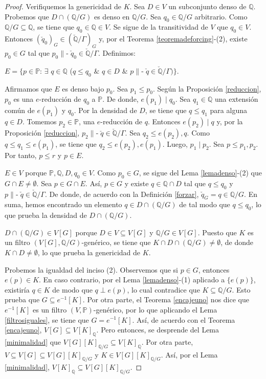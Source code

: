 \documentclass[11pt]{unam_tesis1}
\theoremstyle{MyThmStyle}
\theoremstyle{definition}
\theoremstyle{plain}
\theoremstyle{remark}
\def\forces{\mathop{\parallel\!\!\!-}\nolimits}
\let\Vdash\forces
\let\leq\leqslant
\begin{document}
\begin{proof}
Verifiquemos la genericidad de $K$. Sea $D\in V$ un subconjunto denso de $\mathbb Q$. Probemos que $D\cap (\mathbb Q/G)$ es denso en $\mathbb Q/G$. Sea $q_0\in \mathbb Q/G$ arbitrario. Como $\mathbb Q/G\subseteq \mathbb Q$, se tiene que $q_0\in \mathbb Q\in V$. Se sigue de la transitividad de $V$ que $q_0\in V$. Entonces $(\check{q}_0)_G\in (\check {\mathbb Q}/\Gamma )_G$ y, por el Teorema \ref{teoremadeforcing}-(2), existe $p_0\in G$ tal que $p_0\Vdash \check{q}_0 \in \check {\mathbb Q}/\Gamma$. Definimos:
\begin{center}
$E=\{p\in \mathbb P$: $\exists$ $q\in \mathbb Q$ ($q\leq q_0$ $\&$ $q\in D$ $\&$ $p\Vdash \check{q} \in \check{\mathbb Q}/\Gamma ) \}$.
\end{center}
Afirmamos que $E$ es denso bajo $p_0$. Sea $p_1\leq p_0$. Seg\'un la Proposici\'on \ref{reduccion}, $p_0$ es una $e$-reducci\'on de $q_0$ a $\mathbb P$. De donde, $e(p_1)\mid q_0$. Sea $q_1\in \mathbb Q$ una extensi\'on com\'un de $e(p_1)$ y $q_0$. Por la densidad de $D$, se tiene que $q\leq q_1$ para alguna $q\in D$. Tomemos $p_2\in \mathbb P$, una $e$-reducci\'on de $q$. Entonces $e(p_2)\mid q$ y, por la Proposici\'on \ref{reduccion}, $p_2\Vdash \check{q}\in \check{\mathbb Q}/\Gamma$. Sea $q_2\leq e(p_2), q$. Como $q\leq q_1\leq e(p_1)$, se tiene que $q_2\leq e(p_2), e(p_1)$. Luego, $p_1\mid p_2$. Sea $p\leq p_1,p_2$. Por tanto, $p\leq r$ y $p\in E$.

$E\in V$ porque $\mathbb P,\mathbb Q,D,q_0\in V$. Como $p_0\in G$, se sigue del Lema \ref{lemadenso}-(2) que $G\cap E\neq \emptyset$. Sea $p\in G\cap E$. As\'i, $p\in G$ y existe $q\in \mathbb Q \cap D$ tal que $q\leq q_0$ y $p\Vdash \check{q}\in \check{\mathbb Q}/\Gamma$. De donde, de acuerdo con la Definici\'on \ref{forzar}, $\check{q}_G=q\in \mathbb Q/G$. En suma, hemos encontrado un elemento $q\in D\cap (\mathbb Q/G)$ de tal modo que $q\leq q_0$, lo que prueba la densidad de $D\cap (\mathbb Q/G)$.

$D\cap (\mathbb Q/G)\in V[G]$ porque $D\in V\subseteq V[G]$ y $\mathbb Q/G\in V[G]$. Puesto que $K$ es un filtro $(V[G],\mathbb Q/G)$-gen\'erico, se tiene que $K\cap D\cap (\mathbb Q/G)\neq \emptyset$, de donde $K\cap D\neq \emptyset$, lo que prueba la genericidad de $K$.

Probemos la igualdad del inciso (2). Observemos que si $p\in G$, entonces $e(p)\in K$. En caso contrario, por el Lema \ref{lemadenso}-(1) aplicado a $\{e(p)\}$, existir\'ia $q\in K$ de modo que $q\perp e(p)$, lo cual contradice que $K\subseteq \mathbb Q/G$. Esto prueba que $G\subseteq e^{-1}[K]$. Por otra parte, el Teorema \ref{encajeuno} nos dice que $e^{-1}[K]$ es un filtro $(V,\mathbb P)$-gen\'erico, por lo que aplicando el Lema \ref{filtrosiguales}, se tiene que $G=e^{-1}[K]$. As\'i, de acuerdo con el Teorema \ref{encajeuno}, $V[G]\subseteq V[K]_{\mathbb Q}$. Pero entonces, se desprende del Lema \ref{minimalidad} que $V[G][K]_{\mathbb Q/G}\subseteq V[K]_{\mathbb Q}$. Por otra parte, $V\subseteq V[G]\subseteq V[G][K]_{\mathbb Q/G}$ y $K\in V[G][K]_{\mathbb Q/G}$. As\'i, por el Lema \ref{minimalidad}, $V[K]_{\mathbb Q}\subseteq V[G][K]_{\mathbb Q/G}$.
\end{proof}
\end{document}
